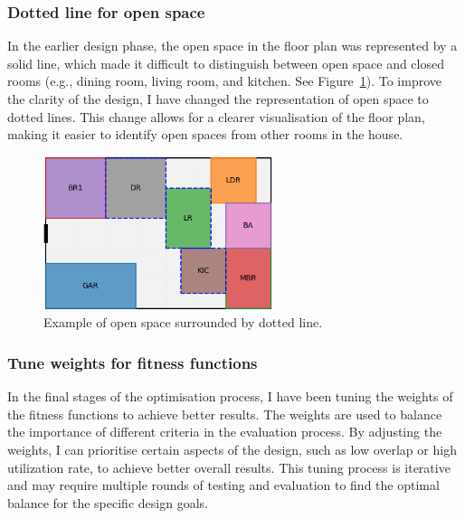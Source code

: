 \documentclass[]{article}
\begin{document}
\subsubsection{Dotted line for open space}
In the earlier design phase, the open space in the floor plan was represented by a solid line, which made it difficult to distinguish between open space and closed rooms (e.g., dining room, living room, and kitchen. See Figure~\ref{fig:open-space-dotted-line}). To improve the clarity of the design, I have changed the representation of open space to dotted lines. This change allows for a clearer visualisation of the floor plan, making it easier to identify open spaces from other rooms in the house.
\begin{figure}[h]
    \centering
    \includegraphics[width=0.6\textwidth]{images/dotted-line.png}
    \caption{Example of open space surrounded by dotted line.}
    \label{fig:open-space-dotted-line}
\end{figure}

\subsubsection{Tune weights for fitness functions}
In the final stages of the optimisation process, I have been tuning the weights of the fitness functions to achieve better results. The weights are used to balance the importance of different criteria in the evaluation process. By adjusting the weights, I can prioritise certain aspects of the design, such as low overlap or high utilization rate, to achieve better overall results. This tuning process is iterative and may require multiple rounds of testing and evaluation to find the optimal balance for the specific design goals.
\end{document}
